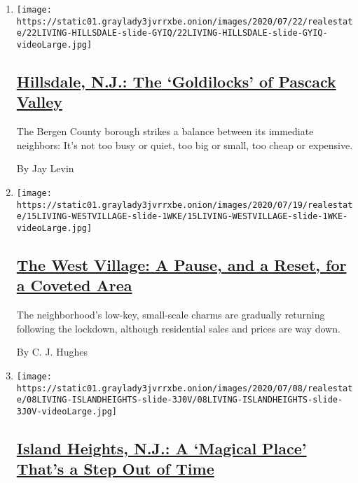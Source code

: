 \begin{enumerate}
\def\labelenumi{\arabic{enumi}.}
\item
  \texttt{[image: https://static01.graylady3jvrrxbe.onion/images/2020/07/22/realestate/22LIVING-HILLSDALE-slide-GYIQ/22LIVING-HILLSDALE-slide-GYIQ-videoLarge.jpg]}

  \hypertarget{hillsdale-nj-the-goldilocks-of-pascack-valley}{%
  \subsection{\texorpdfstring{\href{/2020/07/22/realestate/hillsdale-nj-pascack-valley.html}{Hillsdale,
  N.J.: The `Goldilocks' of Pascack
  Valley}}{Hillsdale, N.J.: The `Goldilocks' of Pascack Valley}}\label{hillsdale-nj-the-goldilocks-of-pascack-valley}}

  The Bergen County borough strikes a balance between its immediate
  neighbors: It's not too busy or quiet, too big or small, too cheap or
  expensive.

  By Jay Levin
\item
  \texttt{[image: https://static01.graylady3jvrrxbe.onion/images/2020/07/19/realestate/15LIVING-WESTVILLAGE-slide-1WKE/15LIVING-WESTVILLAGE-slide-1WKE-videoLarge.jpg]}

  \hypertarget{the-west-village-a-pause-and-a-reset-for-a-coveted-area}{%
  \subsection{\texorpdfstring{\href{/2020/07/15/realestate/west-village-nyc.html}{The
  West Village: A Pause, and a Reset, for a Coveted
  Area}}{The West Village: A Pause, and a Reset, for a Coveted Area}}\label{the-west-village-a-pause-and-a-reset-for-a-coveted-area}}

  The neighborhood's low-key, small-scale charms are gradually returning
  following the lockdown, although residential sales and prices are way
  down.

  By C. J. Hughes
\item
  \texttt{[image: https://static01.graylady3jvrrxbe.onion/images/2020/07/08/realestate/08LIVING-ISLANDHEIGHTS-slide-3J0V/08LIVING-ISLANDHEIGHTS-slide-3J0V-videoLarge.jpg]}

  \hypertarget{island-heights-nj-a-magical-place-thats-a-step-out-of-time}{%
  \subsection{\texorpdfstring{\href{/2020/07/08/realestate/island-heights-nj-a-magical-place-thats-a-step-out-of-time.html}{Island
  Heights, N.J.: A `Magical Place' That's a Step Out of
  Time}}{Island Heights, N.J.: A `Magical Place' That's a Step Out of Time}}\label{island-heights-nj-a-magical-place-thats-a-step-out-of-time}}


\end{enumerate}
